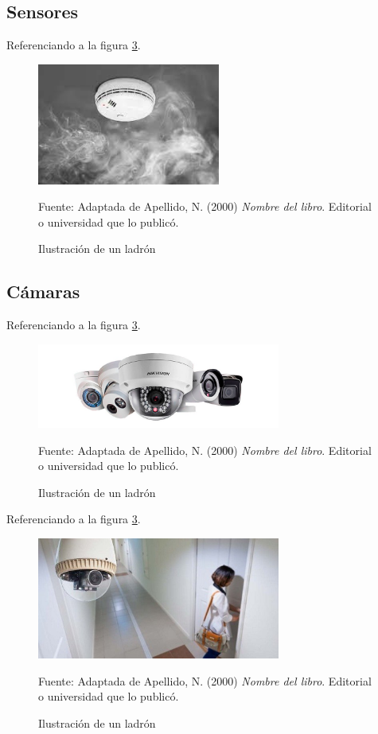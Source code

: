 \subsection{Sensores}
Referenciando a la figura \ref{fig:ejemplo}.
\begin{figure}[H]
    \begin{center}
        \includegraphics[width=6cm]{img/capitulo_3/sensor_de_humo.jpg}
    \end{center}
    \caption{Ilustración de un ladrón}
    Fuente: Adaptada de Apellido, N. (2000) \textit{Nombre del libro}.
    Editorial o universidad que lo publicó.
    \label{fig:ejemplo}
\end{figure}



\subsection{Cámaras}
Referenciando a la figura \ref{fig:ejemplo}.
\begin{figure}[H]
    \begin{center}
        \includegraphics[width=8cm]{img/capitulo_3/camaras.jpg}
    \end{center}
    \caption{Ilustración de un ladrón}
    Fuente: Adaptada de Apellido, N. (2000) \textit{Nombre del libro}.
    Editorial o universidad que lo publicó.
    \label{fig:ejemplo}
\end{figure}

Referenciando a la figura \ref{fig:ejemplo}.
\begin{figure}[H]
    \begin{center}
        \includegraphics[width=8cm]{img/capitulo_3/camara_de_interiores.jpg}
    \end{center}
    \caption{Ilustración de un ladrón}
    Fuente: Adaptada de Apellido, N. (2000) \textit{Nombre del libro}.
    Editorial o universidad que lo publicó.
    \label{fig:ejemplo}
\end{figure}

